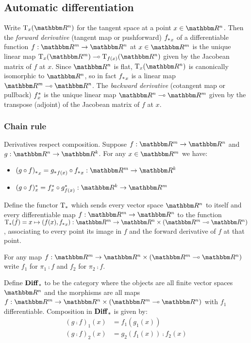 \subsection{Automatic differentiation}

Write $\tangents_x(\RR^n)$ for the tangent space at a point $x \in \RR^n$. Then the \emph{forward derivative}
(tangent map or pushforward) ${f_{*}}_x$ of a differentiable function $f: \RR^m \to \RR^n$ at $x \in \RR^m$
is the unique linear map $\tangents_x(\RR^m) \linearto \tangents_{f(x)}(\RR^n)$ given by the Jacobean matrix
of $f$ at $x$. Since $\RR^n$ is flat, $\tangents_x(\RR^n)$ is canonically isomorphic to $\RR^n$, so in fact
${f_{*}}_x$ is a linear map $\RR^m \linearto \RR^n$. The \emph{backward derivative} (cotangent map or
pullback) $f^{*}_x$ is the unique linear map $\RR^n \linearto \RR^m$ given by the transpose (adjoint) of
the Jacobean matrix of $f$ at $x$.

\subsubsection{Chain rule}

Derivatives respect composition. Suppose $f: \RR^m \to \RR^n$ and $g: \RR^n \to \RR^k$. For any $x \in \RR^m$
we have:

\begin{itemize}
\item $\pushf{(g \comp f)}_x = \pushf{g}_{f(x)} \comp \pushf{f}_x: \RR^m \to \RR^k$
\item $\pullf{(g \comp f)}_x = \pullf{f}_{x} \comp \pullf{g}_{f(x)}: \RR^k \to \RR^m$
\end{itemize}

\begin{definition}
Define the functor $\mathrm{T}_*$ which sends every vector space $\RR^n$ to itself and every differentiable map
$f: \RR^m \to \RR^n$ to the function $\tangents_*(f) = x \mapsto (f(x), \pushf{f}_x): \RR^m \to \RR^n \times
(\RR^m \linearto \RR^n)$, associating to every point its image in $f$ and the forward derivative of $f$ at
that point.
\end{definition}

For any map $f: \RR^m \to \RR^n \times (\RR^m \linearto \RR^n)$ write $f_1$ for $\pi_1 \comp f$ and $f_2$ for
$\pi_2 \comp f$.

\begin{definition}[$\Diff_*$]
\label{def:auto-diff:Diff}
Define $\Diff_*$ to be the category where the objects are all finite vector spaces $\RR^n$ and the morphisms
are all maps $f: \RR^m \to \RR^n \times (\RR^m \linearto \RR^n)$ with $f_1$ differentiable. Composition in
$\Diff_*$ is given by:
\begin{align*}
(g \comp f)_1(x) &= f_1(g_1(x)) \\
(g \comp f)_2(x) &= g_2(f_1(x)) \comp f_2(x)
\end{align*}
\end{definition}

